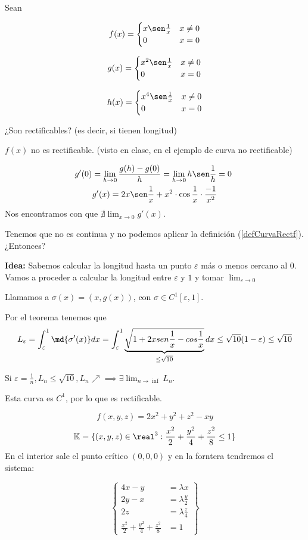 \begin{problem}[3]
Sean

\ppart
\[f(x) = \begin{cases}
x \sen \frac{1}{x} & x\neq 0\\
0 & x=0
\end{cases}\]

\ppart
\[g(x) = \begin{cases}
x^2 \sen\frac{1}{x} & x\neq 0\\
0 & x=0
\end{cases} \]

\ppart
\[h(x) =  \begin{cases}
x^4 \sen\frac{1}{x} & x\neq 0\\
0 & x=0
\end{cases} \]

¿Son rectificables? (es decir, si tienen longitud)
\solution

\spart $f(x)$ no es rectificable. (visto en clase, en el ejemplo de curva no rectificable)

\spart
\begin{gather*}
g'(0) = \lim_{h\to 0} \frac{g(h)-g(0)}{h} = \lim_{h\to 0} h \sen\frac{1}{h} = 0 \\
g'(x) = 2x\sen\frac{1}{x} + x^2\cdot\cos\frac{1}{x}\cdot\frac{-1}{x^2}
\end{gather*}
Nos encontramos con que $\nexists \lim_{x\to 0} g'(x)$.

Tenemos que no es continua y no podemos aplicar la definición (\ref{defCurvaRectf}). ¿Entonces?

\textbf{Idea:} Sabemos calcular la longitud hasta un punto $\varepsilon$ más o menos cercano al $0$. Vamos a proceder a calcular la longitud entre $\varepsilon$ y $1$ y tomar $\lim_{\varepsilon \to 0}$

Llamamos a $\sigma(x) = (x,g(x))$, con $\sigma \in C^1[\varepsilon,1]$.

Por el teorema tenemos que \[L_{\varepsilon} = \int_{\varepsilon}^1 \md{\sigma'(x)}dx = \int_{\varepsilon}^1 \underbrace{\sqrt{1+2xsen\frac{1}{x} - cos\frac{1}{x}}}_{\leq \sqrt{10}}dx \leq \sqrt{10}(1-\varepsilon) \leq \sqrt{10}\]

Si $\varepsilon = \frac{1}{n}, L_n \leq \sqrt{10}, L_n \nearrow \implies \exists \lim_{n\to\inf} L_n$.

\spart Esta curva es $C^1$, por lo que es rectificable.

\end{problem}


\begin{problem}[15.b]
\[f(x,y,z) = 2x^2+y^2+z^2-xy\]
\[\mathbb{K} = \{ (x,y,z)\in \real^3 : \frac{x^2}{2} + \frac{y^2}{4} + \frac{z^2}{8} \leq 1\}\]
\solution
En el interior sale el punto crítico $(0,0,0)$ y en la forntera tendremos el sistema:

\[\left\{\begin{array}{cc}
4x-y&=\lambda x\\
2y-x &=\lambda \frac{y}{2}\\
2z &= \lambda\frac{z}{4}\\
\frac{x^2}{2}+\frac{y^2}{4} + \frac{z^2}{8} &=1
\end{array}\right\}\]
\end{problem}


